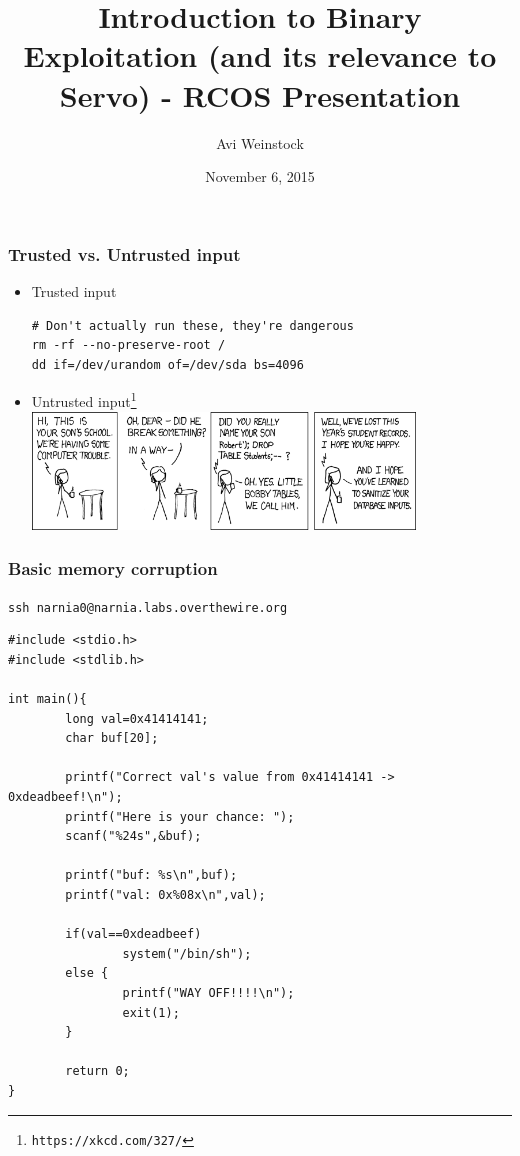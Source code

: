 \documentclass{beamer}
\title{Introduction to Binary Exploitation (and its relevance to Servo) - RCOS Presentation}
\date{November 6, 2015}
\author{Avi Weinstock}
\begin{document}
\maketitle

\begin{frame}[fragile]
\frametitle{Trusted vs. Untrusted input}
\begin{itemize}
\item
Trusted input
\begin{Verbatim}[frame=single]
# Don't actually run these, they're dangerous
rm -rf --no-preserve-root /
dd if=/dev/urandom of=/dev/sda bs=4096
\end{Verbatim}
\item
Untrusted input\footnote{\Verb|https://xkcd.com/327/|}
\includegraphics[width=0.8\textwidth]{xkcd_sqli.png}
\end{itemize}
\end{frame}

\begin{frame}[fragile]
\frametitle{Basic memory corruption}
\verb|ssh narnia0@narnia.labs.overthewire.org|\\
\begin{Verbatim}[frame=single, fontsize=\scriptsize]
#include <stdio.h>
#include <stdlib.h>

int main(){
        long val=0x41414141;
        char buf[20];

        printf("Correct val's value from 0x41414141 -> 0xdeadbeef!\n");
        printf("Here is your chance: ");
        scanf("%24s",&buf);

        printf("buf: %s\n",buf);
        printf("val: 0x%08x\n",val);

        if(val==0xdeadbeef)
                system("/bin/sh");
        else {
                printf("WAY OFF!!!!\n");
                exit(1);
        }

        return 0;
}
\end{Verbatim}
\end{frame}
\end{document}
